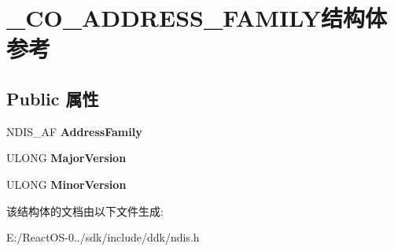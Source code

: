 \hypertarget{struct___c_o___a_d_d_r_e_s_s___f_a_m_i_l_y}{}\section{\+\_\+\+C\+O\+\_\+\+A\+D\+D\+R\+E\+S\+S\+\_\+\+F\+A\+M\+I\+L\+Y结构体 参考}
\label{struct___c_o___a_d_d_r_e_s_s___f_a_m_i_l_y}
\subsection*{Public 属性}
\begin{DoxyCompactItemize}
\item 
\mbox{\label{struct___c_o___a_d_d_r_e_s_s___f_a_m_i_l_y_a4fbdd9c0367a797f9b44227737f8eb2d}} 
N\+D\+I\+S\+\_\+\+AF {\bfseries Address\+Family}
\item 
\mbox{\label{struct___c_o___a_d_d_r_e_s_s___f_a_m_i_l_y_ad83ec3d7091aff70bb7ef86822fcab54}} 
U\+L\+O\+NG {\bfseries Major\+Version}
\item 
\mbox{\label{struct___c_o___a_d_d_r_e_s_s___f_a_m_i_l_y_ac49269472a3425336b5b71b8aaeb8dc7}} 
U\+L\+O\+NG {\bfseries Minor\+Version}
\end{DoxyCompactItemize}


该结构体的文档由以下文件生成\+:\begin{DoxyCompactItemize}
\item 
E\+:/\+React\+O\+S-\/0../sdk/include/ddk/ndis.\+h\end{DoxyCompactItemize}
